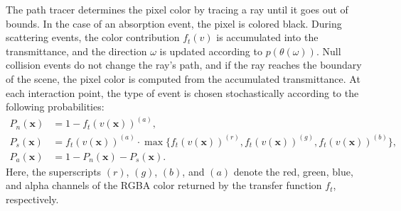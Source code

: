 The path tracer determines the pixel color by tracing a ray until it goes out
of bounds. In the case of an absorption event, the pixel is colored black.
During scattering events, the color contribution $f_t(v)$ is accumulated into
the transmittance, and the direction $\omega$ is updated according to
$p(\theta(\omega))$. Null collision events do not change the ray’s path, and
if the ray reaches the boundary of the scene, the pixel color is computed from
the accumulated transmittance. At each interaction point, the type of event is
chosen stochastically according to the following probabilities:
\begin{align}
    P_n(\mathbf{x}) &= 1 - f_t(v(\mathbf{x}))^{(a)}, \\
    P_s(\mathbf{x}) &= f_t(v(\mathbf{x}))^{(a)} \cdot \max\{
        f_t(v(\mathbf{x}))^{(r)},
        f_t(v(\mathbf{x}))^{(g)},
        f_t(v(\mathbf{x}))^{(b)}
    \}, \\
    P_a(\mathbf{x}) &= 1 - P_n(\mathbf{x}) - P_s(\mathbf{x}).
\end{align}
Here, the superscripts $(r)$, $(g)$, $(b)$, and $(a)$ denote the red, green,
blue, and alpha channels of the RGBA color returned by the transfer function
$f_t$, respectively.